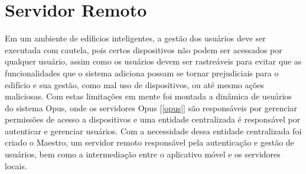\chapter{Servidor Remoto}
\label{chap:maestro}
Em um ambiente de edíficios inteligentes, a gestão dos usuários deve ser executada com cautela, pois certos dispositivos não podem
ser acessados por qualquer usuário, assim como os usuários devem ser rastreáveis para evitar que as funcionalidades que o sistema adiciona
possam se tornar prejudiciais para o edifício e sua gestão, como mal uso de dispositivos, ou até mesmo ações maliciosas. Com estas limitações
em mente foi montada a dinâmica de usuários do sistema Opus, onde os servidores Opus [\ref{opus}] são responsáveis por gerenciar permissões
de acesso a dispositivos e uma entidade centralizada é responsável por autenticar e gerenciar usuários. Com a necessidade dessa entidade centralizada
foi criado o Maestro, um servidor remoto responsável pela autenticação e gestão de usuários, bem como a intermediação entre o aplicativo móvel e 
os servidores locais.

